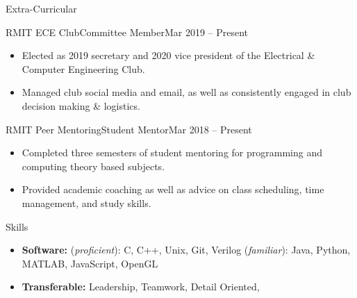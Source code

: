 \documentclass[]{mcdowellcv}
\begin{document}
	\begin{cvsection}{Extra-Curricular}
		\begin{cvsubsection}{RMIT ECE Club}{Committee Member}{Mar 2019 -- Present}
			\begin{itemize}
				\item Elected as 2019 secretary and 2020 vice president of the Electrical \& Computer Engineering Club.
				\item Managed club social media and email, as well as consistently engaged in club decision making \& logistics.
			\end{itemize}
		\end{cvsubsection}

		\begin{cvsubsection}{RMIT Peer Mentoring}{Student Mentor}{Mar 2018 -- Present}
			\begin{itemize}
				\item Completed three semesters of student mentoring for programming and computing theory based subjects.
				\item Provided academic coaching as well as advice on class scheduling, time management, and study skills.
			\end{itemize}
		\end{cvsubsection}
	\end{cvsection}

	\begin{cvsection}{Skills}
		\begin{cvsubsection}{}{}{}
			\begin{itemize}
				\item \textbf{Software:} (\emph{proficient}): C, C++, Unix, Git, Verilog (\emph{familiar}): Java, Python, MATLAB, JavaScript, OpenGL
				\item \textbf{Transferable:} Leadership, Teamwork, Detail Oriented, 
			\end{itemize}
		\end{cvsubsection}
	\end{cvsection}
\end{document}
